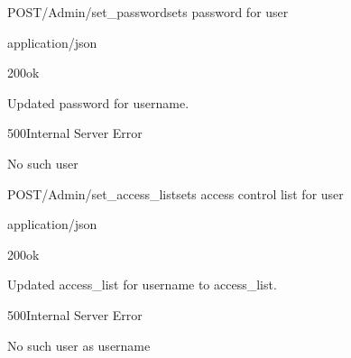\documentclass[12pt, etter]{article}
\begin{document}
\begin{apiRoute}{POST}{/Admin/set\_password}{sets password for user}
    \begin{routeParameter}
    \end{routeParameter}
    \begin{routeResponse}{application/json}
        \begin{routeResponseItem}{200}{ok}
            \begin{routeResponseItemBody}
                Updated password for {username}.
            \end{routeResponseItemBody}
        \end{routeResponseItem}
        \begin{routeResponseItem}{500}{Internal Server Error}
            \begin{routeResponseItemBody}
                No such user
            \end{routeResponseItemBody}
        \end{routeResponseItem}
    \end{routeResponse}
\end{apiRoute}

\begin{apiRoute}{POST}{/Admin/set\_access\_list}{sets access control list for user}
    \begin{routeParameter}
    \end{routeParameter}
    \begin{routeResponse}{application/json}
        \begin{routeResponseItem}{200}{ok}
            \begin{routeResponseItemBody}
                Updated access_list for {username} to {access_list}.
            \end{routeResponseItemBody}
        \end{routeResponseItem}
        \begin{routeResponseItem}{500}{Internal Server Error}
            \begin{routeResponseItemBody}
                No such user as {username}
            \end{routeResponseItemBody}
        \end{routeResponseItem}
    \end{routeResponse}
\end{apiRoute}
\end{document}
